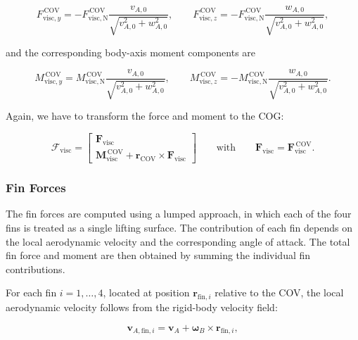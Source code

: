 \begin{equation}
	F_{\mathrm{visc}, y}^\mathrm{\, COV}
	=
	-F_\mathrm{visc, N}^\mathrm{\, COV} \frac{v_{A, 0}}{\sqrt{v_{A, 0}^2 + w_{A, 0}^2}}, 
	\qquad
	F_{\mathrm{visc}, z} ^\mathrm{\, COV}
	= 
	-F_\mathrm{visc, N}^\mathrm{\, COV} \frac{w_{A, 0}}{\sqrt{v_{A, 0}^2 + w_{A, 0}^2}},
\end{equation}

and the corresponding body-axis moment components are

\begin{equation}
	M_{\mathrm{visc}, y}^\mathrm{\, COV}
	=
	M_\mathrm{visc, N}^\mathrm{\, COV} \frac{v_{A, 0}}{\sqrt{v_{A, 0}^2 + w_{A, 0}^2}}, 
	\qquad
	M_{\mathrm{visc}, z} ^\mathrm{\, COV}
	= 
	-M_\mathrm{visc, N}^\mathrm{\, COV} \frac{w_{A, 0}}{\sqrt{v_{A, 0}^2 + w_{A, 0}^2}}.
\end{equation}

Again, we have to transform the force and moment to the COG:

\begin{equation}
	\bm{\mathcal{F}}_\mathrm{visc}
	=
	\begin{bmatrix}
		\bm{F}_\mathrm{visc} \\ 
		\bm{M}_\mathrm{visc}^\mathrm{\, COV} + \bm{r}_\mathrm{COV} \times \bm{F}_\mathrm{visc} 
	\end{bmatrix}
	\qquad
	\text{with}
	\qquad
	\bm{F}_\mathrm{visc}
	=
	\bm{F}_\mathrm{visc}^{\mathrm{\, COV}}.	
\end{equation}





\subsubsection{Fin Forces}
The fin forces are computed using a lumped approach, in which each of the four fins is treated as a single lifting surface. The contribution of each fin depends on the local aerodynamic velocity and the corresponding angle of attack. The total fin force and moment are then obtained by summing the individual fin contributions.

For each fin $i=1,\dots,4$, located at position $\bm{r}_{\mathrm{fin}, i}$ relative to the COV, the local aerodynamic velocity follows from the rigid-body velocity field:

\begin{equation}
	\bm{v}_{A, \mathrm{fin}, i} 
	= 
	\bm{v}_A 
	+ 
	\bm{\omega}_B \times \bm{r}_{\mathrm{fin}, i},
\end{equation}


